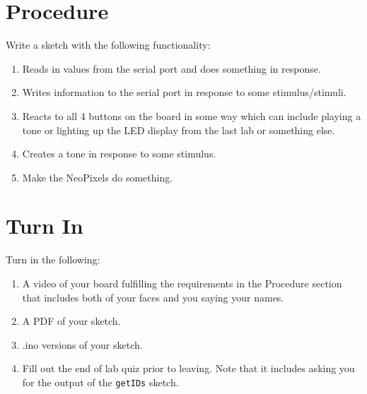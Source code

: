 \section{Procedure}
Write a sketch with the following functionality:
\begin{enumerate}
    \item Reads in values from the serial port and does something in response.
    \item Writes information to the serial port in response to some stimulus/stimuli.
    \item Reacts to all 4 buttons on the board in some way which can include playing
            a tone or lighting up the LED display from the last lab or something else.
    \item Creates a tone in response to some stimulus.
    \item Make the NeoPixels do something.
\end{enumerate}

\section{Turn In}
Turn in the following:
\begin{enumerate}
    \item A video of your board fulfilling the requirements in the Procedure section 
            that includes both of your faces and you saying your names.
    \item A PDF of your sketch.
    \item .ino versions of your sketch.
    \item Fill out the end of lab quiz prior to leaving. Note that it includes asking you 
            for the output of the \lstinline$getIDs$ sketch. 
\end{enumerate}